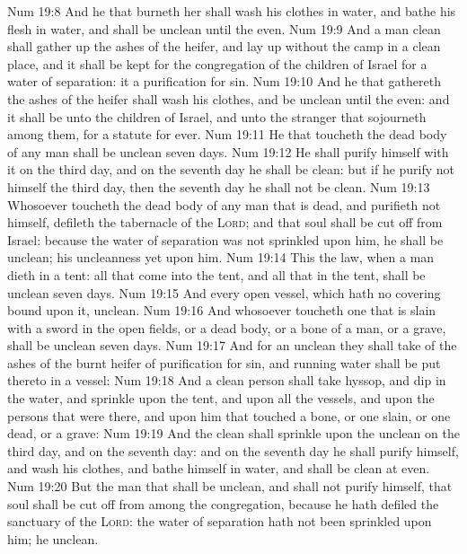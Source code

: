 \vs Num 19:8 And he that burneth her shall wash his clothes in water, and bathe his flesh in water, and shall be unclean until the even.
\vs Num 19:9 And a man  clean shall gather up the ashes of the heifer, and lay  up without the camp in a clean place, and it shall be kept for the congregation of the children of Israel for a water of separation: it  a purification for sin.
\vs Num 19:10 And he that gathereth the ashes of the heifer shall wash his clothes, and be unclean until the even: and it shall be unto the children of Israel, and unto the stranger that sojourneth among them, for a statute for ever.
\vs Num 19:11 He that toucheth the dead body of any man shall be unclean seven days.
\vs Num 19:12 He shall purify himself with it on the third day, and on the seventh day he shall be clean: but if he purify not himself the third day, then the seventh day he shall not be clean.
\vs Num 19:13 Whosoever toucheth the dead body of any man that is dead, and purifieth not himself, defileth the tabernacle of the \textsc{Lord}; and that soul shall be cut off from Israel: because the water of separation was not sprinkled upon him, he shall be unclean; his uncleanness  yet upon him.
\vs Num 19:14 This  the law, when a man dieth in a tent: all that come into the tent, and all that  in the tent, shall be unclean seven days.
\vs Num 19:15 And every open vessel, which hath no covering bound upon it,  unclean.
\vs Num 19:16 And whosoever toucheth one that is slain with a sword in the open fields, or a dead body, or a bone of a man, or a grave, shall be unclean seven days.
\vs Num 19:17 And for an unclean  they shall take of the ashes of the burnt heifer of purification for sin, and running water shall be put thereto in a vessel:
\vs Num 19:18 And a clean person shall take hyssop, and dip  in the water, and sprinkle  upon the tent, and upon all the vessels, and upon the persons that were there, and upon him that touched a bone, or one slain, or one dead, or a grave:
\vs Num 19:19 And the clean  shall sprinkle upon the unclean on the third day, and on the seventh day: and on the seventh day he shall purify himself, and wash his clothes, and bathe himself in water, and shall be clean at even.
\vs Num 19:20 But the man that shall be unclean, and shall not purify himself, that soul shall be cut off from among the congregation, because he hath defiled the sanctuary of the \textsc{Lord}: the water of separation hath not been sprinkled upon him; he  unclean.
